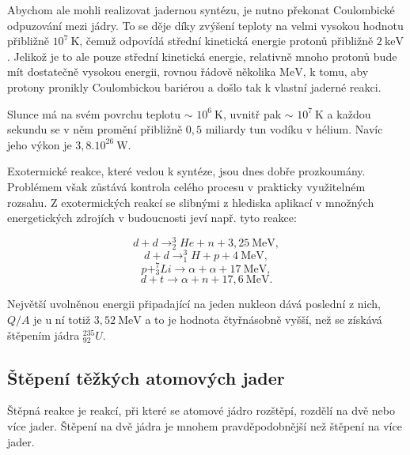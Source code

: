 \documentclass[../../main.tex]{subfiles}
\begin{document}
Abychom ale mohli realizovat jadernou syntézu, je nutno překonat Coulombické odpuzování mezi jádry. To se děje díky zvýšení teploty na velmi vysokou hodnotu přibližně $10^7 ~\mathrm{K}$, čemuž odpovídá střední kinetická energie protonů přibližně $2 ~\mathrm{keV}$. Jelikož je to ale pouze střední kinetická energie, relativně mnoho protonů bude mít dostatečně vysokou energii, rovnou řádově několika $\mathrm{MeV}$, k tomu, aby protony pronikly Coulombickou bariérou a došlo tak k vlastní jaderné reakci.

Slunce má na svém povrchu teplotu $\sim$ $10^6 ~\mathrm{K}$, uvnitř pak $\sim$ $10^7 ~\mathrm{K}$ a každou sekundu se v něm promění přibližně $0,5$ miliardy tun vodíku v hélium. Navíc jeho výkon je $3,8.10^{26} ~\mathrm{W}$.

Exotermické reakce, které vedou k syntéze, jsou dnes dobře prozkoumány. Problémem však zůstává kontrola celého procesu v prakticky využitelném rozsahu. Z exotermických reakcí se slibnými z hlediska aplikací v množných energetických zdrojích v budoucnosti jeví např. tyto reakce:

\begin{equation}
d + d \rightarrow ^{3}_{2} He + n + 3,25 ~\mathrm{MeV},
\end{equation} 
\begin{equation}
d + d \rightarrow ^{3}_{1} H + p + 4 ~\mathrm{MeV},
\end{equation} 
\begin{equation}
p + ^{7}_{3} Li \rightarrow \alpha + \alpha + 17 ~\mathrm{MeV},
\end{equation} 
\begin{equation}
d + t \rightarrow \alpha + n + 17,6 ~\mathrm{MeV}.
\end{equation} 

Největší uvolněnou energii připadající na jeden nukleon dává poslední z nich, $Q/A$ je u ní totiž $3, 52 ~\mathrm{MeV}$ a to je hodnota čtyřnásobně vyšší, než se získává štěpením jádra $^{235}_{92} U$. 

\subsection{Štěpení těžkých atomových jader}

Štěpná reakce je reakcí, při které se atomové jádro rozštěpí, rozdělí na dvě nebo více jader. Štěpení na dvě jádra je mnohem pravděpodobnější než štěpení na více jader.
\end{document}
